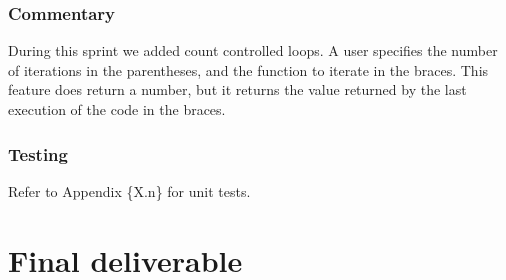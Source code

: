 \documentclass[a4paper, oneside, 11pt]{report}
\begin{document}
	\subsection{Commentary}
	During this sprint we added count controlled loops. A user specifies the number of iterations in the parentheses, and the function to iterate in the braces. This feature does return a number, but it returns the value returned by the last execution of the code in the braces.

	\subsection{Testing}
	Refer to Appendix \{X.n\} for unit tests.

	\clearpage




	\chapter{Final deliverable}\label{Impl}
\end{document}
